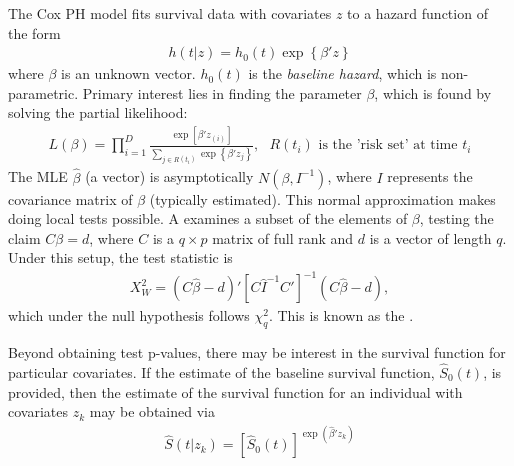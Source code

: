 \documentclass[11pt]{article}
\begin{document}
The Cox PH model fits survival data with covariates $z$ to a hazard function of the form
\begin{eqnarray*}
h(t|z) = h_0(t)\exp\left\{ \beta'z  \right\}
\end{eqnarray*}
where $\beta$ is an unknown vector. $h_0(t)$ is the \textit{baseline hazard}, which is non-parametric. Primary interest lies in finding the parameter $\beta$, which is found by solving the partial likelihood:
\begin{eqnarray*}
L(\beta) = \prod_{i=1}^D \frac{\exp\left[\beta'z_{(i)}\right]}{\sum_{j \in R(t_i)}\exp\left\{\beta'z_j\right\}}, \text{ }R(t_i)\text{ is the 'risk set' at time }t_i
\end{eqnarray*}
The MLE $\hat{\beta}$ (a vector) is asymptotically $N(\beta, I^{-1})$, where $I$ represents the covariance matrix of $\beta$ (typically estimated). This normal approximation makes doing local tests possible. A  examines a subset of the elements of $\beta$, testing the claim $C\beta = d$, where $C$ is a $q\times p$ matrix of full rank and $d$ is a vector of length $q$. Under this setup, the test statistic is
\begin{eqnarray*}
X_W^2 = \left(C\hat{\beta} - d\right)'\left[C\hat{I}^{-1}C'\right]^{-1}\left(C\hat{\beta} - d\right),
\end{eqnarray*}
which under the null hypothesis follows $\chi^2_q$. This is known as the .

Beyond obtaining test p-values, there may be interest in the survival function for particular covariates. If the estimate of the baseline survival function, $\hat{S}_0(t)$, is provided, then the estimate of the survival function for an individual with covariates $z_k$ may be obtained via
\begin{eqnarray*}
\hat{S}(t|z_k) = \left[\hat{S}_0(t)\right]^{\exp\left(\hat{\beta}'z_k \right)}
\end{eqnarray*} 
\end{document}
